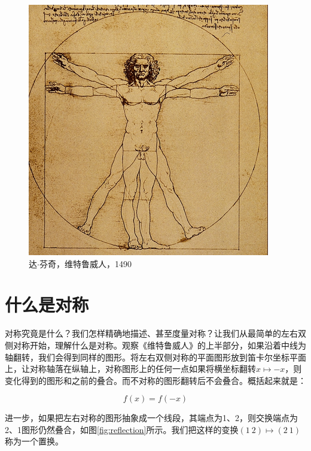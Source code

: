 \documentclass[b5paper]{ctexart}
\begin{document}
\begin{figure}[htbp]
 \centering
 \includegraphics[scale=0.35]{img/vitruvian-man.png}
 \captionsetup{labelformat=empty}
 \caption{达$\cdot$芬奇，维特鲁威人，1490}
\end{figure}

\section{什么是对称}
对称究竟是什么？我们怎样精确地描述、甚至度量对称？让我们从最简单的左右双侧对称开始，理解什么是对称。观察《维特鲁威人》的上半部分，如果沿着中线为轴翻转，我们会得到同样的图形。将左右双侧对称的平面图形放到笛卡尔坐标平面上，让对称轴落在纵轴上，对称图形上的任何一点如果将横坐标翻转$x \mapsto -x$，则变化得到的图形和之前的叠合。而不对称的图形翻转后不会叠合。概括起来就是：

\[
f(x) = f(-x)
\]

进一步，如果把左右对称的图形抽象成一个线段，其端点为1、2，则交换端点为2、1图形仍然叠合，如图\ref{fig:reflection}所示。我们把这样的变换$(1\ 2) \mapsto (2\ 1)$称为一个置换。
\end{document}
